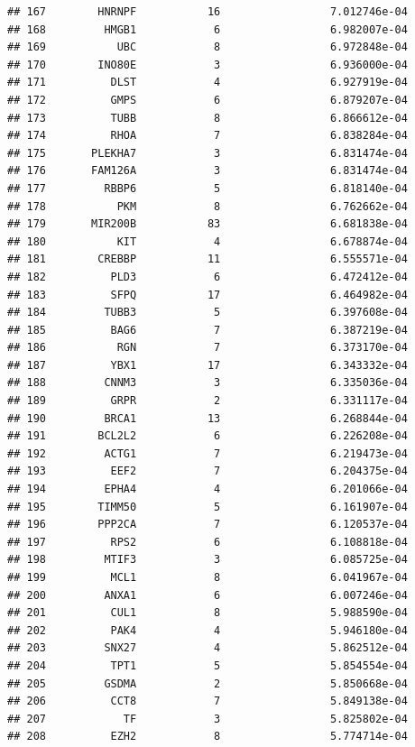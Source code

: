 \documentclass[
]{article}
\begin{document}
\begin{verbatim}
## 167        HNRNPF           16                 7.012746e-04
## 168         HMGB1            6                 6.982007e-04
## 169           UBC            8                 6.972848e-04
## 170        INO80E            3                 6.936000e-04
## 171          DLST            4                 6.927919e-04
## 172          GMPS            6                 6.879207e-04
## 173          TUBB            8                 6.866612e-04
## 174          RHOA            7                 6.838284e-04
## 175       PLEKHA7            3                 6.831474e-04
## 176       FAM126A            3                 6.831474e-04
## 177         RBBP6            5                 6.818140e-04
## 178           PKM            8                 6.762662e-04
## 179       MIR200B           83                 6.681838e-04
## 180           KIT            4                 6.678874e-04
## 181        CREBBP           11                 6.555571e-04
## 182          PLD3            6                 6.472412e-04
## 183          SFPQ           17                 6.464982e-04
## 184         TUBB3            5                 6.397608e-04
## 185          BAG6            7                 6.387219e-04
## 186           RGN            7                 6.373170e-04
## 187          YBX1           17                 6.343332e-04
## 188         CNNM3            3                 6.335036e-04
## 189          GRPR            2                 6.331117e-04
## 190         BRCA1           13                 6.268844e-04
## 191        BCL2L2            6                 6.226208e-04
## 192         ACTG1            7                 6.219473e-04
## 193          EEF2            7                 6.204375e-04
## 194         EPHA4            4                 6.201066e-04
## 195        TIMM50            5                 6.161907e-04
## 196        PPP2CA            7                 6.120537e-04
## 197          RPS2            6                 6.108818e-04
## 198         MTIF3            3                 6.085725e-04
## 199          MCL1            8                 6.041967e-04
## 200         ANXA1            6                 6.007246e-04
## 201          CUL1            8                 5.988590e-04
## 202          PAK4            4                 5.946180e-04
## 203         SNX27            4                 5.862512e-04
## 204          TPT1            5                 5.854554e-04
## 205         GSDMA            2                 5.850668e-04
## 206          CCT8            7                 5.849138e-04
## 207            TF            3                 5.825802e-04
## 208          EZH2            8                 5.774714e-04

\end{verbatim}
\end{document}
